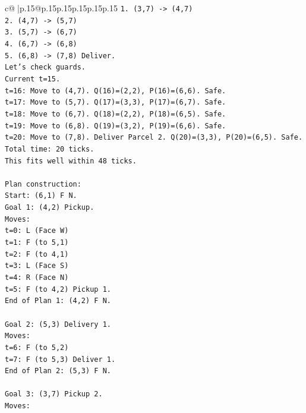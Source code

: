 \documentclass{article}
\begin{document}
{\begin{supertabular}{c@{$\;$}|p{.15\linewidth}@{}p{.15\linewidth}p{.15\linewidth}p{.15\linewidth}p{.15\linewidth}p{.15\linewidth}}
{{{\texttt{1. (3,7) {-}> (4,7)} \\
\texttt{2. (4,7) {-}> (5,7)} \\
\texttt{3. (5,7) {-}> (6,7)} \\
\texttt{4. (6,7) {-}> (6,8)} \\
\texttt{5. (6,8) {-}> (7,8) Deliver.} \\
\texttt{Let's check guards.} \\
\texttt{Current t=15.} \\
\texttt{t=16: Move to (4,7). Q(16)=(2,2), P(16)=(6,6). Safe.} \\
\texttt{t=17: Move to (5,7). Q(17)=(3,3), P(17)=(6,7). Safe.} \\
\texttt{t=18: Move to (6,7). Q(18)=(2,2), P(18)=(6,5). Safe.} \\
\texttt{t=19: Move to (6,8). Q(19)=(3,2), P(19)=(6,6). Safe.} \\
\texttt{t=20: Move to (7,8). Deliver Parcel 2. Q(20)=(3,3), P(20)=(6,5). Safe.} \\
\texttt{Total time: 20 ticks.} \\
\texttt{This fits well within 48 ticks.} \\
\\ 
\texttt{Plan construction:} \\
\texttt{Start: (6,1) F N.} \\
\texttt{Goal 1: (4,2) Pickup.} \\
\texttt{Moves:} \\
\texttt{t=0: L (Face W)} \\
\texttt{t=1: F (to 5,1)} \\
\texttt{t=2: F (to 4,1)} \\
\texttt{t=3: L (Face S)} \\
\texttt{t=4: R (Face N)} \\
\texttt{t=5: F (to 4,2) Pickup 1.} \\
\texttt{End of Plan 1: (4,2) F N.} \\
\\ 
\texttt{Goal 2: (5,3) Delivery 1.} \\
\texttt{Moves:} \\
\texttt{t=6: F (to 5,2)} \\
\texttt{t=7: F (to 5,3) Deliver 1.} \\
\texttt{End of Plan 2: (5,3) F N.} \\
\\ 
\texttt{Goal 3: (3,7) Pickup 2.} \\
\texttt{Moves:} \\
}}}
\end{supertabular}}
\end{document}
